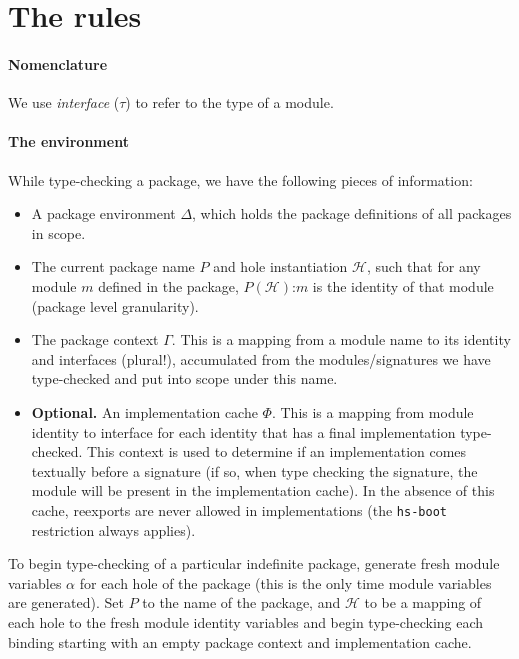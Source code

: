 \documentclass{article}
\begin{document}
\section{The rules}

\paragraph{Nomenclature}  We use \emph{interface} ($\tau$) to refer to the type of a module.

\paragraph{The environment}  While type-checking a package, we have the following pieces of information:

\begin{itemize}
    \item A package environment $\Delta$, which holds the package definitions of all packages in scope.
    \item The current package name $P$ and hole instantiation $\mathcal{H}$, such that for any module $m$ defined in the package, $P(\mathcal{H})$:$m$ is the identity of that module (package level granularity).
    \item The package context $\Gamma$.  This is a mapping from a module name to its identity and interfaces (plural!), accumulated from the modules/signatures we have type-checked and put into scope under this name.
    \item \textbf{Optional.} An implementation cache $\Phi$.  This is a mapping from module identity to interface for each identity that has a final implementation type-checked.  This context is used to determine if an implementation comes textually before a signature (if so, when type checking the signature, the module will be present in the implementation cache).  In the absence of this cache, reexports are never allowed in implementations (the \verb|hs-boot| restriction always applies).
\end{itemize}

To begin type-checking of a particular indefinite package, generate fresh module variables $\alpha$ for each hole of the package (this is the only time module variables are generated).  Set $P$ to the name of the package, and $\mathcal{H}$ to be a mapping of each hole to the fresh module identity variables and begin type-checking each binding starting with an empty package context and implementation cache.
\end{document}
